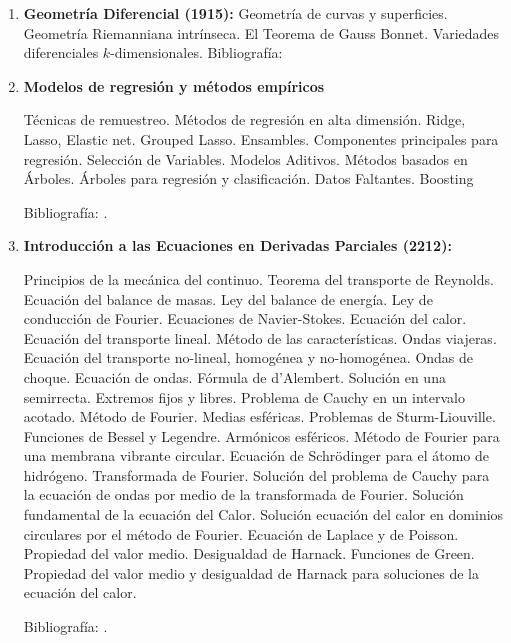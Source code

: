 \documentclass[a4paper, 12pt]{article}
\begin{document}
\begin{enumerate}
\item\textbf{Geometría Diferencial (1915):} Geometría de curvas y superficies.
 Geometría Riemanniana
intrínseca. El Teorema de Gauss Bonnet. Variedades diferenciales $k$-dimensionales.
Bibliografía: \cite{docarmo,morgan,oneill}


\item\textbf{Modelos de regresión y métodos empíricos}

 Técnicas de remuestreo. Métodos de regresión en alta dimensión. Ridge, Lasso, Elastic net.  Grouped Lasso. Ensambles. Componentes principales para regresión. Selección de Variables. Modelos Aditivos. Métodos basados en Árboles. Árboles para regresión y clasificación. Datos Faltantes.  Boosting

Bibliografía: \cite{friedman, james, trevor, efron}.

\item\textbf{Introducción a las Ecuaciones en Derivadas Parciales (2212):}  


Principios de la mecánica del continuo. Teorema del transporte de Reynolds. Ecuación del balance de masas. Ley del balance de energía. Ley de conducción de Fourier. Ecuaciones de Navier-Stokes. Ecuación del calor.   Ecuación del transporte lineal. Método de las características. Ondas viajeras. Ecuación del transporte no-lineal, homogénea y no-homogénea. Ondas de choque. Ecuación de ondas.  Fórmula de d'{}Alembert. Solución en una semirrecta. Extremos fijos y libres. Problema de Cauchy en un intervalo acotado. Método de Fourier.  Medias esféricas. Problemas de Sturm-Liouville. Funciones de Bessel y Legendre. Armónicos esféricos. Método de Fourier para una membrana vibrante circular. Ecuación de Schr\"odinger para el átomo de hidrógeno. Transformada de Fourier. Solución del problema de Cauchy para la ecuación de ondas por medio de la transformada de Fourier.  Solución fundamental de la ecuación del Calor.  Solución ecuación del calor en dominios circulares por el método de Fourier. Ecuación de Laplace y de Poisson. Propiedad del valor medio. Desigualdad de Harnack.  Funciones de Green. Propiedad del valor medio y desigualdad de Harnack para soluciones de la ecuación del calor. 







Bibliografía: \cite{LawrenceC.Evans271,WalterCraig494,AlexanderKomech496,JulianFernandezBonder511,DavidBorthwick689,FritzJohn692,SandroSalsa693,AndrasVasy695,YehudaPinchover697,PavelDrabek698, AslakTveito699}.







\end{enumerate}
\end{document}
